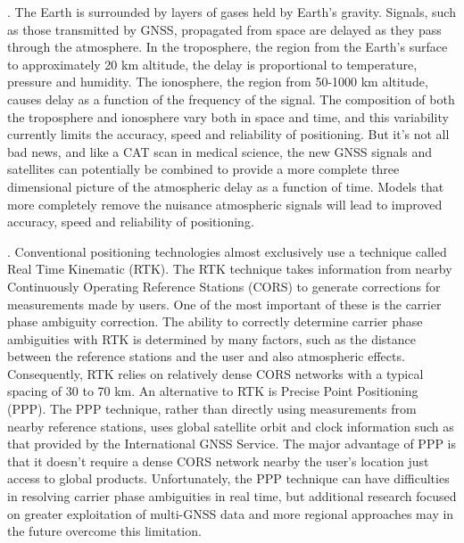 . The Earth is surrounded by layers of gases held by Earth's gravity. Signals, such as those transmitted by GNSS, propagated from space are delayed as they pass through the atmosphere. In the troposphere, the region from the Earth’s surface to approximately 20 km altitude, the delay is proportional to temperature, pressure and humidity. The ionosphere, the region from 50-1000 km altitude, causes delay as a function of the frequency of the signal. The composition of both the troposphere and ionosphere vary both in space and time, and this variability currently limits the accuracy, speed and reliability of positioning. But it’s not all bad news, and like a CAT scan in medical science, the new GNSS signals and satellites can potentially be combined to provide a more complete three dimensional picture of the atmospheric delay as a function of time. Models that more completely remove the nuisance atmospheric signals will lead to improved accuracy, speed and reliability of positioning.

. Conventional positioning technologies almost exclusively use a technique called Real Time Kinematic (RTK). The RTK technique takes information from nearby Continuously Operating Reference Stations (CORS) to generate corrections for measurements made by users. One of the most important of these is the carrier phase ambiguity correction. The ability to correctly determine carrier phase ambiguities with RTK is determined by many factors, such as the distance between the reference stations and the user and also atmospheric effects. Consequently, RTK relies on relatively dense CORS networks with a typical spacing of 30 to 70 km. An alternative to RTK is Precise Point Positioning (PPP). The PPP technique, rather than directly using measurements from nearby reference stations, uses global satellite orbit and clock information such as that provided by the International GNSS Service. The major advantage of PPP is that it doesn’t require a dense CORS network nearby the user’s location just access to global products. Unfortunately, the PPP technique can have difficulties in resolving carrier phase ambiguities in real time, but additional research focused on greater exploitation of multi-GNSS data and more regional approaches may in the future overcome this limitation.